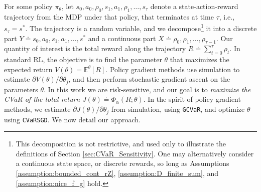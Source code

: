 \documentclass[letterpaper]{article}
\newcommand{\E}{\mathbb{E}}
\newcommand{\cvar}{\Phi_\alpha}
\begin{document}
For some policy $\pi_\theta$, let $s_0,a_0,\rho_0,s_1,a_1,\rho_1,\dots,s_\tau$ denote a state-action-reward trajectory from the MDP under that policy, that terminates at time $\tau$, i.e., $s_\tau = s^*$. The trajectory is a random variable, and we decompose\footnote{This decomposition is not restrictive, and used only to illustrate the definitions of Section \ref{sec:CVaR_Sensitivity}. One may alternatively consider a continuous state space, or discrete rewards, so long as Assumptions \ref{assumption:bounded_cont_rZ}, \ref{assumption:D_finite_sum}, and \ref{assumption:nice_f_g} hold.} it into a discrete part $Y \doteq s_0,a_0,s_1,a_1,\dots,s^*$ and a continuous part $X \doteq \rho_0,\rho_1,\dots,\rho_{\tau-1}$. Our quantity of interest is the total reward along the trajectory $R \doteq \sum_{t=0}^{\tau} \rho_t$.
In standard RL, the objective is to find the parameter $\theta$ that maximizes the expected return $V(\theta) = \E^\theta \left[ R \right]$. Policy gradient methods \cite{baxter2001infinite,MarTsi98,peters_reinforcement_2008} use simulation to estimate $\partial V(\theta) / \partial \theta_j$, and then perform stochastic gradient ascent on the parameters $\theta$. In this work we are risk-sensitive, and our goal is to \emph{maximize the CVaR of the total return}
$
J(\theta) \doteq \cvar (R;\theta).
$
In the spirit of policy gradient methods, we estimate $\partial J(\theta) / \partial \theta_j$ from simulation, using \texttt{GCVaR}, and optimize $\theta$ using \texttt{CVaRSGD}. We now detail our approach.

%
%
\end{document}
